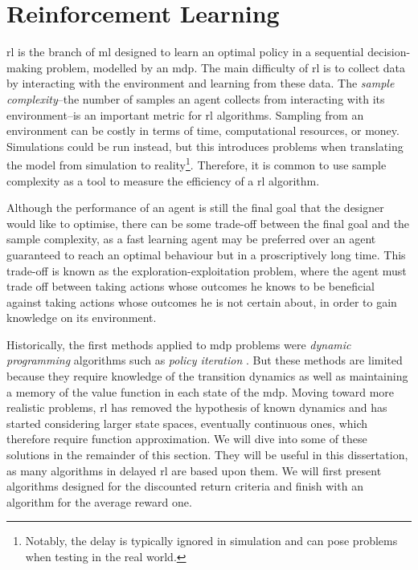 \section{Reinforcement Learning}
\label{sec:rl}

\gls{rl} is the branch of \gls{ml} designed to learn an optimal policy in a sequential decision-making problem, modelled by an \gls{mdp}. 
The main difficulty of \gls{rl} is to collect data by interacting with the environment and learning from these data.
The \emph{sample complexity}--the number of samples an agent collects from interacting with its environment--is an important metric for \gls{rl} algorithms. 
Sampling from an environment can be costly in terms of time, computational resources, or money. 
Simulations could be run instead, but this introduces problems when translating the model from simulation to reality\footnote{Notably, the delay is typically ignored in simulation and can pose problems when testing in the real world.}. 
Therefore, it is common to use sample complexity as a tool to measure the efficiency of a \gls{rl} algorithm. 

Although the performance of an agent is still the final goal that the designer would like to optimise, there can be some trade-off between the final goal and the sample complexity, as a fast learning agent may be preferred over an agent guaranteed to reach an optimal behaviour but in a proscriptively long time. 
This trade-off is known as the exploration-exploitation problem, where the agent must trade off between taking actions whose outcomes he knows to be beneficial against taking actions whose outcomes he is not certain about, in order to gain knowledge on its environment. 

Historically, the first methods applied to \gls{mdp} problems were \emph{dynamic programming} algorithms such as \emph{policy iteration} \cite{howard1960dynamic}. 
But these methods are limited because they require knowledge of the transition dynamics as well as maintaining a memory of the value function in each state of the \gls{mdp}.
Moving toward more realistic problems, \gls{rl} has removed the hypothesis of known dynamics and has started considering larger state spaces, eventually continuous ones, which therefore require function approximation. 
We will dive into some of these solutions in the remainder of this section. 
They will be useful in this dissertation, as many algorithms in delayed \gls{rl} are based upon them.
We will first present algorithms designed for the discounted return criteria and finish with an algorithm for the average reward one.

